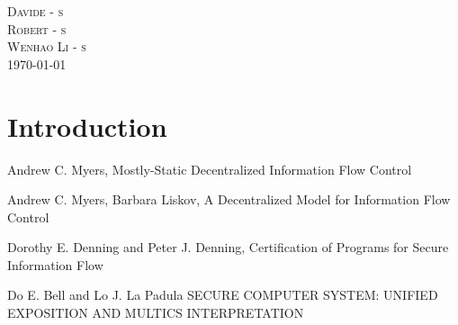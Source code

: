\documentclass{article}
\begin{document}
\begin{titlepage}
\vspace{1.0cm}
\textsc{\Large Davide \vspace*{1pt} - s\\[0.05in]}
\textsc{\Large Robert \vspace*{1pt} - s\\[0.05in]}
\textsc{\Large Wenhao Li \vspace*{1pt} - s\\[0.05in]}
\vspace{1cm}
\textsc{\Large \today\\[0.05in]}

\end{titlepage}
\newpage
\tableofcontents
\clearpage

\newpage
\section{Introduction}




\begin{thebibliography}{1}

    Andrew C. Myers,
    Mostly-Static Decentralized Information Flow Control

    Andrew C. Myers, Barbara Liskov,
	A Decentralized Model for Information Flow Control

    Dorothy E. Denning and Peter J. Denning,
	Certification of Programs for Secure Information Flow

    Do E. Bell and Lo J. La Padula
	SECURE COMPUTER SYSTEM: UNIFIED EXPOSITION AND MULTICS INTERPRETATION
\end{thebibliography}
\end{document}
